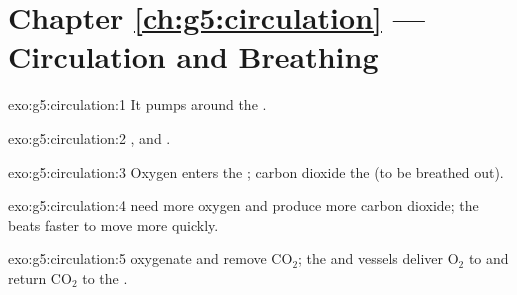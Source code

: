 \section*{Chapter \ref{ch:g5:circulation} --- Circulation and Breathing}

\begin{solution}{exo:g5:circulation:1}
It pumps  around the .
\end{solution}

\begin{solution}{exo:g5:circulation:2}
,  and .
\end{solution}

\begin{solution}{exo:g5:circulation:3}
Oxygen enters the ; carbon dioxide  the  (to be
breathed out).
\end{solution}

\begin{solution}{exo:g5:circulation:4}
 need more oxygen and produce more carbon dioxide; the 
beats faster to move  more quickly.
\end{solution}

\begin{solution}{exo:g5:circulation:5}
 oxygenate  and remove CO$_2$; the  and vessels deliver
O$_2$ to  and return CO$_2$ to the .
\end{solution}

